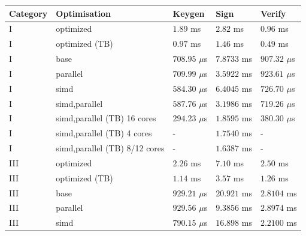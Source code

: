 \documentclass[11pt]{report}
\theoremstyle{definition}
\theoremstyle{plain}
\begin{document}
\begin{table}[H]
  \centering
  \begin{tabular}{l|l|lll}
    \hline
    Category                     & Optimisation                  & Keygen          & Sign        & Verify          \\
    \hline
    \hline
    I \cite{aguilar2023return}   & optimized                     & $1.89$ ms       & $2.82$ ms   & $0.96$ ms       \\
    I \cite{aguilar2023return}   & optimized (TB)                & $0.97$ ms       & $1.46$ ms   & $0.49$ ms       \\
    \arrayrulecolor{lightgray}\hline\arrayrulecolor{black}
    I                            & base                          & $708.95$ $\mu$s & $7.8733$ ms & $907.32$ $\mu$s \\
    I                            & parallel                      & $709.99$ $\mu$s & $3.5922$ ms & $923.61$ $\mu$s \\
    I                            & simd                          & $584.30$ $\mu$s & $6.4045$ ms & $726.70$ $\mu$s \\
    I                            & simd,parallel                 & $587.76$ $\mu$s & $3.1986$ ms & $719.26$ $\mu$s \\
    I                            & simd,parallel (TB) 16 cores   & $294.23$ $\mu$s & $1.8595$ ms & $380.30$ $\mu$s \\
    I                            & simd,parallel (TB) 4 cores    & -               & $1.7540$ ms & -               \\
    I                            & simd,parallel (TB) 8/12 cores & -               & $1.6387$ ms & -               \\
    \hline
    III \cite{aguilar2023return} & optimized                     & $2.26$ ms       & $7.10$ ms   & $2.50$ ms       \\
    III \cite{aguilar2023return} & optimized (TB)                & $1.14$ ms       & $3.57$ ms   & $1.26$ ms       \\
    \arrayrulecolor{lightgray}\hline\arrayrulecolor{black}
    III                          & base                          & $929.21$ $\mu$s & $20.921$ ms & $2.8104$ ms     \\
    III                          & parallel                      & $929.56$ $\mu$s & $9.3856$ ms & $2.8974$ ms     \\
    III                          & simd                          & $790.15$ $\mu$s & $16.898$ ms & $2.2100$ ms     \\

\end{tabular}
\end{table}
\end{document}
